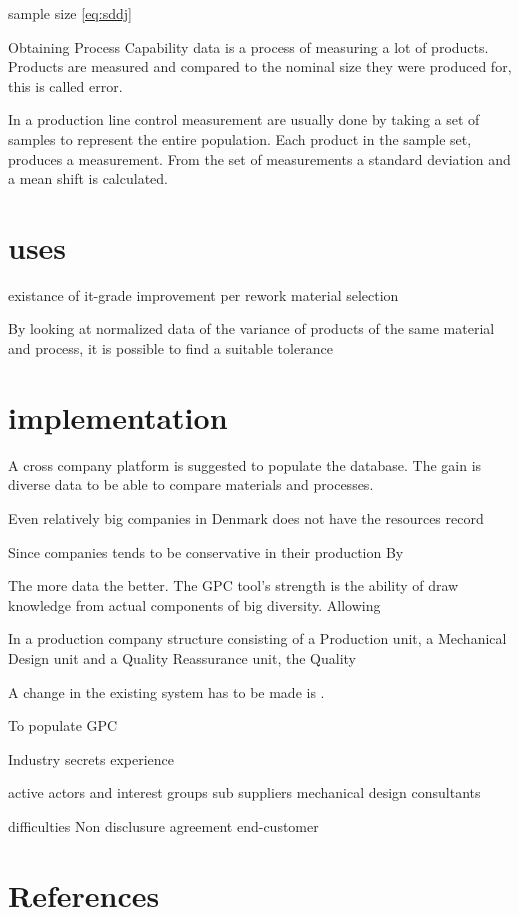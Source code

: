 \documentclass[aip,amsmath, reprint, author-year]{revtex4-1}
\begin{document}
sample size  \ref{eq:sddj}




Obtaining Process Capability data is a process of measuring a lot of products.
Products are measured and compared to the nominal size they were produced for, this is called error.

In a production line control measurement are usually done by taking a set of samples to represent the entire population. Each product in the sample set, produces a measurement. From the set of measurements a standard deviation and a mean shift is calculated.

\section{uses}
existance of it-grade
improvement per rework
material selection





By looking at normalized data of the variance of products of the same material and process, it is possible to find a suitable tolerance

\section{implementation}





A cross company platform is suggested to populate the database. The gain is diverse data to be able to compare materials and processes. 

Even relatively big companies in Denmark does not have the resources record 

Since companies tends to be conservative in their production 
By 

The more data the better. The GPC tool's strength is the ability of draw knowledge from actual components of big diversity. Allowing  

In a production company structure consisting of a Production unit, a Mechanical Design unit and a Quality Reassurance unit, the Quality 

A change in the existing system has to be made is .
 

\cite{perzyk1998selection}

To populate GPC 

Industry secrets
	experience
	
	
active actors and interest groups
	sub suppliers 
	mechanical design consultants
	

difficulties
	Non disclusure agreement
	end-customer
	

\section*{References}

\end{document}
